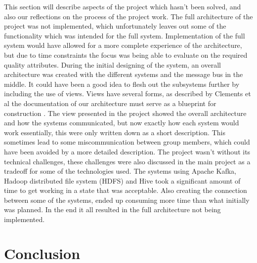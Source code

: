 \documentclass[conference]{IEEEtran}
\begin{document}
This section will describe aspects of the project which hasn't been solved, and also our reflections on the process of the project work. \vspace{2mm}\newline
The full architecture of the project was not implemented, which unfortunately leaves out some of the functionality which was intended for the full system. Implementation of the full system would have allowed for a more complete experience of the architecture, but due to time constraints the focus was being able to evaluate on the required quality attributes.
During the initial designing of the system, an overall architecture was created with the different systems and the message bus in the middle. It could have been a good idea to flesh out the subsystems further by including the use of views. Views have several forms, as described by Clements et al the documentation of our architecture must serve as a blueprint for construction \cite{Clements_2014}.
The view presented in the project showed the overall architecture and how the systems communicated, but now exactly how each system would work essentially, this were only written down as a short description. This sometimes lead to some miscommunication between group members, which could have been avoided by a more detailed description. \newline
The project wasn't without its technical challenges, these challenges were also discussed in the main project as a tradeoff for some of the technologies used. The systems using Apache Kafka, Hadoop distributed file system (HDFS) and Hive took a significant amount of time to get working in a state that was acceptable. Also creating the connection between some of the systems, ended up consuming more time than what initially was planned. In the end it all resulted in the full architecture not being implemented.


\section{Conclusion}




\vspace{12pt}
\end{document}
